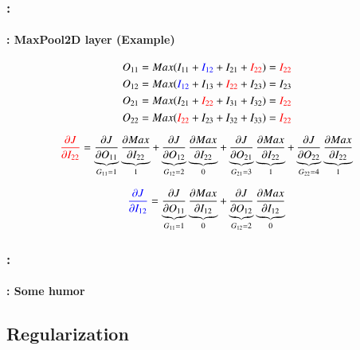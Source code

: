 \documentclass[xcolor=table]{beamer}
\begin{document}
\begin{frame}
	\frametitle{\insertshortsubtitle: \insertsection}
	\framesubtitle{\insertsubsection: MaxPool2D layer (Example)}
	
	
	\begin{center}
		\vskip-6pt
	\end{center}\vskip-16pt
	
	{\scriptsize 
		\[O_{11} = Max(I_{11} + \textcolor{blue}{I_{12}} + I_{21} + \textcolor{red}{I_{22}}) = \textcolor{red}{I_{22}}  \]
		\[O_{12} = Max(\textcolor{blue}{I_{12}} + I_{13} + \textcolor{red}{I_{22}} + I_{23}) = I_{23}  \]
		\[O_{21} = Max(I_{21} + \textcolor{red}{I_{22}} + I_{31} + I_{32}) = \textcolor{red}{I_{22}} \]
		\[O_{22} = Max(\textcolor{red}{I_{22}} + I_{23} + I_{32} + I_{33}) = \textcolor{red}{I_{22}}  \]
		
		\[\textcolor{red}{\frac{\partial J}{\partial I_{22}}} 
		= \underbrace{\frac{\partial J}{\partial O_{11}}}_{G_{11} = 1} 
		\underbrace{\frac{\partial Max}{\partial I_{22}}}_{1}
		+ \underbrace{\frac{\partial J}{\partial O_{12}}}_{G_{12} = 2} 
		\underbrace{\frac{\partial Max}{\partial I_{22}}}_{0}
		+ \underbrace{\frac{\partial J}{\partial O_{21}}}_{G_{21} = 3} 
		\underbrace{\frac{\partial Max}{\partial I_{22}}}_{1}
		+ \underbrace{\frac{\partial J}{\partial O_{22}}}_{G_{22} = 4} 
		\underbrace{\frac{\partial Max}{\partial I_{22}}}_{1}\]
		
		\[\textcolor{blue}{\frac{\partial J}{\partial I_{12}}} 
		= \underbrace{\frac{\partial J}{\partial O_{11}}}_{G_{11} = 1} 
		\underbrace{\frac{\partial Max}{\partial I_{12}}}_{0}
		+ \underbrace{\frac{\partial J}{\partial O_{12}}}_{G_{12} = 2} 
		\underbrace{\frac{\partial Max}{\partial I_{12}}}_{0}\]
	}
	
\end{frame}

\begin{frame}
	\frametitle{\insertshortsubtitle: \insertsection}
	\framesubtitle{\insertsubsection: Some humor}

	\begin{center}
	\end{center}

\end{frame}

\subsection{Regularization}
\end{document}
